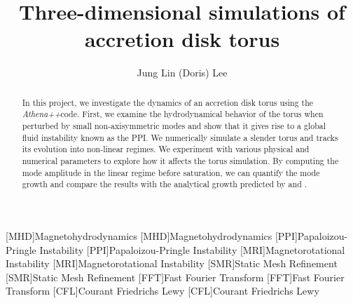 \documentclass[iop,revtex4]{emulateapj}
\begin{document}
[MHD]{Magnetohydrodynamics}
[MHD]{Magnetohydrodynamics}
[PPI]{Papaloizou-Pringle Instability}
[PPI]{Papaloizou-Pringle Instability}
[MRI]{Magnetorotational Instability}
[MRI]{Magnetorotational Instability}
[SMR]{Static Mesh Refinement}
[SMR]{Static Mesh Refinement}
[FFT]{Fast Fourier Transform}
[FFT]{Fast Fourier Transform}
[CFL]{Courant Friedrichs Lewy}
[CFL]{Courant Friedrichs Lewy}
\newcommand{\app}{\textit{Athena++}}
\title{Three-dimensional simulations of accretion disk torus}
\author{Jung Lin (Doris) Lee}
\begin{abstract}
In this project, we investigate the dynamics of an accretion disk torus using the \app code. First, we examine the hydrodynamical  behavior of the torus when perturbed by small non-axisymmetric modes and show that it gives rise to a global fluid instability known as the \ac{PPI}. We numerically simulate a slender torus and tracks its evolution into non-linear regimes. We experiment with various physical and numerical parameters to explore how it affects the torus simulation. By computing the mode amplitude in the linear regime before saturation, we can quantify the mode growth and compare the results with the analytical growth predicted by \cite{Goldreich:1986A} and \cite{Papaloizou:1984A}. %
\end{abstract}
\end{document}
